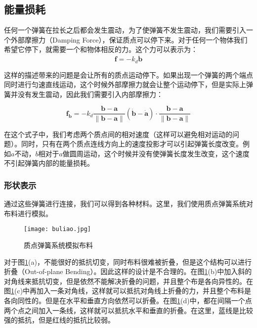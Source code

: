 \documentclass[openany]{progbookcn}
\begin{document}
\subsection{能量损耗}

任何一个弹簧在拉长之后都会发生震动，为了使弹簧不发生震动，我们需要引入一个外部摩擦力（Damping Force），保证质点可以停下来。对于任何一个物体我们希望它停下，就需要一个和物体相反的力。这个力可以表示为：
\begin{equation}
	\mathbf{f}=-k_d\mathbf{\dot{b}}
\end{equation}

这样的描述带来的问题是会让所有的质点运动停下。如果出现一个弹簧的两个端点同时进行匀速直线运动，这个时候外部摩擦力就会让整个运动停下，但是实际上弹簧并没有发生震动，因此我们需要引入内部摩擦力：

\begin{equation}
	\mathbf{f}_{\mathbf{b}}=-k_{d}\frac{\mathbf{b}-\mathbf{a}}{\|\mathbf{b}-\mathbf{a}\|}(\dot{\mathbf{b}}-\dot{\mathbf{a}})\cdot \frac{\mathbf{b}-\mathbf{a}}{\|\mathbf{b}-\mathbf{a}\|}
\end{equation}

在这个式子中，我们考虑两个质点间的相对速度（这样可以避免相对运动的问题）。同时，只有在两个质点连线方向上的速度投影才可以引起弹簧长度改变。例如$a$不动，$b$相对于$a$做圆周运动，这个时候并没有使弹簧长度发生改变，这个速度不引起弹簧内部的能量损耗。

\subsubsection{形状表示}

通过这些弹簧进行连接，我们可以得到各种材料。这里，我们使用质点弹簧系统对布料进行模拟。

\begin{figure}[H]
	\centering
	\texttt{[image: buliao.jpg]}
	\caption{质点弹簧系统模拟布料}
	\label{fig:buliao}
\end{figure}

对于图\ref{fig:buliao}(a)，不能很好的抵抗切变，同时布料很难被折叠，但是这个结构可以进行折叠（Out-of-plane Bending）。因此这样的设计是不合理的。在图\ref{fig:buliao}(b)中加入斜的对角线来抵抗切变，但是依然不能解决折叠的问题，并且整个布是各向异性的。在图\ref{fig:buliao}(c)中再加入一条对角线，这样就可以抵抗对角线上折叠的力，并且整个布料是各向同性的。但是在水平和垂直方向依然可以折叠。在图\ref{fig:buliao}(d)中，都在间隔一个点两个点之间加入一条线，这样就可以抵抗水平和垂直的折叠。在这里，蓝线是比较强的抵抗，但是红线的抵抗比较弱。
\end{document}
